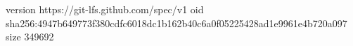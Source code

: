 version https://git-lfs.github.com/spec/v1
oid sha256:4947b649773f380cdfc6018dc1b162b40c6a0f05225428ad1e9961e4b720a097
size 349692
